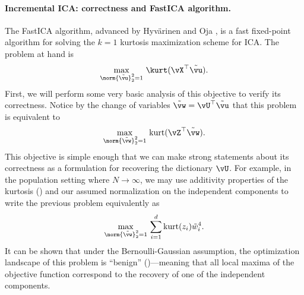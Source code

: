 \documentclass[../../book-main.tex]{subfiles}
\begin{document}
\paragraph{Incremental ICA: correctness and FastICA algorithm.}
The FastICA algorithm, advanced by Hyv\"{a}rinen and Oja
\cite{hyvarinen-1997}, is a fast fixed-point algorithm for solving
the $k=1$ kurtosis maximization scheme for ICA.
The problem at hand is
\begin{equation}\label{eq:kurtosis-maximization-sphere-finitesample}
    \max_{\norm{\tilde{\vu}}_2^2 = 1}\, \kurt(\vX^\top \tilde{\vu}).
\end{equation}
First, we will perform some very basic analysis of this objective to
verify its correctness. Notice by the change of variables $\tilde{\vw} =
\vU^\top \tilde{\vu}$ that this problem is equivalent to
\begin{equation*}
    \max_{\norm{\tilde{\vw}}_2^2 = 1}\,
    \mathrm{kurt}(\vZ^\top \tilde{\vw}).
\end{equation*}
This objective is simple enough that we can make strong statements
about its correctness as a formulation for recovering the dictionary $\vU$.
For example, in the population setting where $N \to \infty$,
we may use additivity properties of the kurtosis
() and our assumed
normalization on the independent components to write the previous
problem equivalently as
\begin{equation}\label{eq:kurtosis-maximization-sphere-population-simple}
    \max_{\norm{\tilde{\vw}}_2^2 = 1}\,
    \sum_{i=1}^d \mathrm{kurt}(z_i) \tilde{w}_i^4.
\end{equation}
It can be shown that under the Bernoulli-Gaussian assumption, the
optimization landscape of this problem is ``benign''
()---meaning that all local
maxima of the objective function correspond to the recovery of one of
the independent components.
\end{document}
